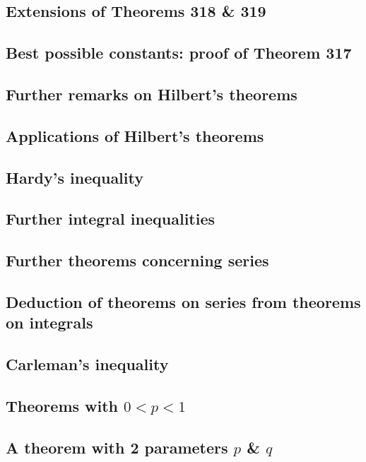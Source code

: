 \documentclass[oneside]{book}
\numberwithin{equation}{section}
\begin{document}
\subsection{Extensions of Theorems 318 \& 319}

\subsection{Best possible constants: proof of Theorem 317}

\subsection{Further remarks on Hilbert's theorems}

\subsection{Applications of Hilbert's theorems}

\subsection{Hardy's inequality}

\subsection{Further integral inequalities}

\subsection{Further theorems concerning series}

\subsection{Deduction of theorems on series from theorems on integrals}

\subsection{Carleman's inequality}

\subsection{Theorems with $0 < p < 1$}

\subsection{A theorem with 2 parameters $p$ \& $q$}
\end{document}
